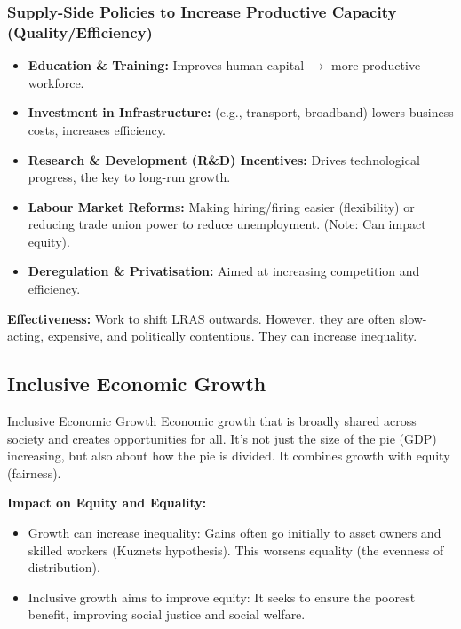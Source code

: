 \documentclass[11pt, a4paper, twoside]{book}
\begin{document}
\subsubsection{Supply-Side Policies to Increase Productive Capacity (Quality/Efficiency)}

\begin{itemize}
  \item \textbf{Education \& Training:} Improves human capital $\rightarrow$ more productive workforce.
  \item \textbf{Investment in Infrastructure:} (e.g., transport, broadband) lowers business costs, increases efficiency.
  \item \textbf{Research \& Development (R\&D) Incentives:} Drives technological progress, the key to long-run growth.
  \item \textbf{Labour Market Reforms:} Making hiring/firing easier (flexibility) or reducing trade union power to reduce unemployment. (Note: Can impact equity).
  \item \textbf{Deregulation \& Privatisation:} Aimed at increasing competition and efficiency.
\end{itemize}
\textbf{Effectiveness:} Work to shift LRAS outwards. However, they are often slow-acting, expensive, and politically contentious. They can increase inequality.

\subsection{Inclusive Economic Growth}

\begin{keyterm}{Inclusive Economic Growth}
Economic growth that is broadly shared across society and creates opportunities for all. It's not just the size of the pie (GDP) increasing, but also about how the pie is divided. It combines growth with equity (fairness).
\end{keyterm}

\textbf{Impact on Equity and Equality:}
\begin{itemize}
  \item Growth can increase inequality: Gains often go initially to asset owners and skilled workers (Kuznets hypothesis). This worsens equality (the evenness of distribution).
  \item Inclusive growth aims to improve equity: It seeks to ensure the poorest benefit, improving social justice and social welfare.
\end{itemize}
\end{document}
